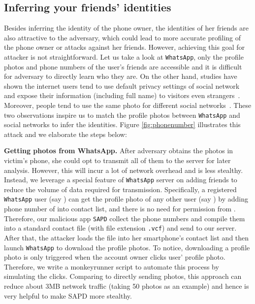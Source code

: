 \documentclass{sig-alternate}
\begin{document}
\begin{figure}[ht]
\end{figure}


\subsection{Inferring your friends' identities}
\label{sec:attack2}


Besides inferring the identity of the phone owner, the identities of her friends are also attractive to the adversary, which could lead to more accurate profiling of the phone owner or attacks against her friends. However, achieving this goal for attacker is not straightforward. Let us take a look at \texttt{WhatsApp}, only the profile photos and phone numbers of the user's friends are accessible and it is difficult for adversary to directly learn who they are. On the other hand, studies have shown the internet users tend to use default privacy settings of social network and expose their information (including full name) to visitors even strangers~\cite{SocialMediaPrivacy}. Moreover, people tend to use the same photo for different social networks~\cite{SameProfilePicture}. These two observations inspire us to match the profile photos between \texttt{WhatsApp} and social networks to infer the identities. Figure \ref{fig:phonenumber} illustrates this attack and we elaborate the steps below:


\vspace{2pt}\noindent\textbf{Getting photos from WhatsApp.}
After adversary obtains the photos in victim's phone, she could opt to transmit all of them to the server for later analysis. However, this will incur a lot of network overhead and is less stealthy. Instead, we leverage a special feature of \texttt{WhatsApp} server on adding friends to reduce the volume of data required for transmission. Specifically, a registered \texttt{WhatsApp} user (say ) can get the profile photo of any other user (say ) by adding phone number of  into  contact list, and there is no need for permission from . Therefore, our malicious app \texttt{SAPD} collect the phone numbers and compile them into a standard contact file (with file extension \texttt{.vcf}) and send to our server. After that, the attacker loads the file into her smartphone's contact list and then launch \texttt{WhatsApp} to download the profile photos. To notice, downloading a profile photo is only triggered when the account owner clicks user' profile photo. Therefore, we write a monkeyrunner script to automate this process by simulating the clicks. Comparing to directly sending photos, this approach can reduce about 3MB network traffic (taking 50 photos as an example) and hence is very helpful to make SAPD more stealthy.
\end{document}
